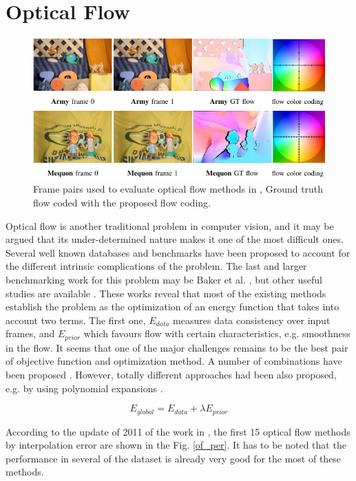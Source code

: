\section{Optical Flow}

   \begin{figure}[thpb]
      \centering
      \includegraphics[width=1.0\textwidth]{../images/of_db.png}
      \caption{Frame pairs used to evaluate optical flow methods in \cite{c17}, Ground truth flow coded with the proposed flow coding. }
      \label{tr_db}
   \end{figure}

Optical flow is another traditional problem in computer vision, and it may be argued that its under-determined nature makes it one of the most difficult ones. 
Several well known databases and benchmarks have been proposed to account for the different intrinsic complications of the problem. The last and larger benchmarking 
work for this problem may be Baker et al. \cite{c17}, but other useful studies are available \cite{c27}. 
These works reveal that most of the existing methods establish the problem as the optimization of an energy function that takes into account two terms. The first one, $E_{data}$ 
measures data consistency over input frames, and $E_{prior}$ which favours flow with certain characteristics, e.g. smoothness in the flow. It seems that one of the major 
challenges remains to be the best pair of objective function and optimization method. A number of combinations have been proposed \cite{c29}\cite{c30}\cite{c32}. However, 
totally different approaches had been also proposed, e.g. by using polynomial expansions \cite{c28}.

\begin{equation}
E_{global} = E_{data} + \lambda E_{prior}
\label{eq_ener}
\end{equation}

According to the update of 2011 of the work in \cite{c17}, the first 15 optical flow methods by interpolation error are shown in the Fig. \ref{of_per}. It has to be noted that the performance in several of the dataset is already very good for the most of these methods.

